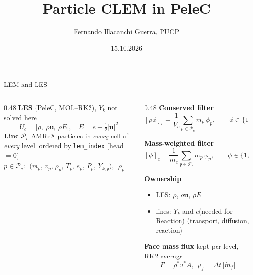 \documentclass[aspectratio=169,10pt]{beamer}
\title{Particle CLEM in PeleC}
\author{Fernando Illacanchi Guerra, PUCP}
\date{15.10.2026}
\newcommand{\Pl}{\mathcal{P}}         %
\newcommand{\filt}[1]{[#1]_c}
\begin{document}
\begin{frame}[plain]
  \titlepage
\end{frame}

\begin{frame}{LEM and LES}
\small
\begin{columns}[T]
\begin{column}{0.48\textwidth}
\textbf{LES} (PeleC, MOL--RK2), $Y_k$ not solved here
\[
U_c = \big[\rho,\ \rho\mathbf{u},\ \rho E \big],\quad E = e + \tfrac12|\mathbf{u}|^2
\]
\textbf{Line} $\Pl_c$ AMReX particles in \emph{every} cell of \emph{every} level, ordered by \texttt{lem\_index} (head $=0$)
\[
p \in \Pl_c:\ \ \big(m_p,\, v_p,\, \rho_p,\, T_p,\, e_p,\, P_p,\, Y_{k,p}\big),\ \ \rho_p = \frac{m_p}{v_p}
\]
\end{column}
\begin{column}{0.48\textwidth}
\textbf{Conserved filter}
\[
\filt{\rho\phi} = \frac{1}{V_c}\sum_{p\in\Pl_c} m_p\,\phi_p ,\qquad \phi \in \{1,\ Y_k,\ e\}
\]

\textbf{Mass-weighted filter}
\[
\filt{\phi} = \frac{1}{m_c}\sum_{p\in\Pl_c} m_p\,\phi_p ,\qquad \phi \in \{1,\ Y_k,\ e\}
\]


\textbf{Ownership}
\begin{itemize}
  \item LES: $\rho$, $\rho\mathbf{u}$, $\rho E$
  \item lines: $Y_k$ and $e$(needed for Reaction) (transport, diffusion, reaction)
\end{itemize}
\textbf{Face mass flux} kept per level, RK2 average
\[
\ F = \rho^{*}u^{*}A,\ \ \mu_f = \Delta t\,|\dot m_f|
\]
\end{column}
\end{columns}
\end{frame}
\end{document}
